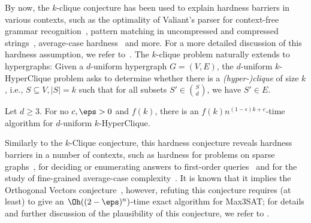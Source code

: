   By now, the $k$-clique conjecture has been used to explain hardness barriers in various contexts, such as the optimality of Valiant's parser for context-free grammar recognition~\cite{AbboudBVW18},  pattern matching in uncompressed and compressed strings~\cite{BringmannGL17, AbboudBBK17}, average-case hardness~\cite{Boix-AdseraBB19} and more. 
  For a more detailed discussion of this hardness assumption, we refer to~\cite{AbboudBVW18}.
%
  The $k$-clique problem naturally extends to hypergraphs: Given a $d$-uniform hypergraph $G=(V,E)$, the $d$-uniform $k$-HyperClique problem asks to determine whether there is a \emph{(hyper-)clique} of size $k$, i.e., $S\subseteq V, |S|=k$ such that for all subsets $S' \in {S \choose d}$, we have $S'\in E$. 
%
\begin{hypo}
Let $d\ge 3$. For no $c,\eps > 0$ and $f(k)$, there is an $f(k)n^{(1 - \epsilon)k+c}$-time algorithm for $d$-uniform $k$-HyperClique.
\end{hypo}
%
Similarly to the $k$-Clique conjecture, this hardness conjecture reveals hardness barriers in a number of contexts, such as hardness for problems on sparse graphs~\cite{LincolnVWW18}, for deciding or enumerating answers to first-order queries~\cite{BringmannFK19, CarmeliK19} and for the study of fine-grained average-case complexity~\cite{Boix-AdseraBB19}. It is known that it implies the Orthogonal Vectors conjecture~\cite{AbboudBDN18}, however, refuting this conjecture requires (at least) to give an $\Oh((2-\eps)^n)$-time exact algorithm for Max3SAT; for details and further discussion of the plausibility of this conjecture, we refer to \cite{LincolnVWW18}.   
%
